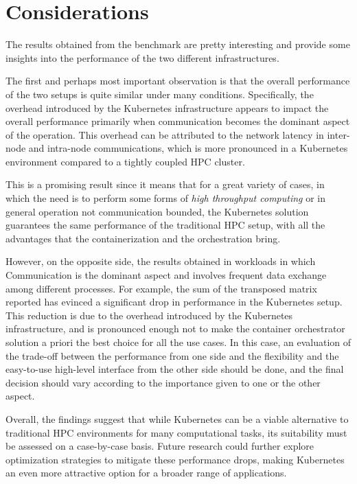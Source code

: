 \section{Considerations}

The results obtained from the benchmark are pretty interesting and provide some
insights into the performance of the two different infrastructures.

The first and perhaps most important observation is that the overall performance
of the two setups is quite similar under many conditions.
Specifically, the overhead introduced by the Kubernetes infrastructure appears
to impact the overall performance primarily when communication becomes the
dominant aspect of the operation. This overhead can be attributed to the network
latency in inter-node and intra-node communications, which is more pronounced in
a Kubernetes environment compared to a tightly coupled HPC cluster.

This is a promising result since it means that for a great variety of cases, in
which the need is to perform some forms of \textit{high throughput computing} or
in general operation not communication bounded, the Kubernetes solution
guarantees the same performance of the traditional HPC setup, with all the
advantages that the containerization and the orchestration bring.

However, on the opposite side, the results obtained in workloads in which
Communication is the dominant aspect and involves frequent data exchange among
different processes. For example, the sum of the transposed matrix reported has
evinced a significant drop in performance in the Kubernetes setup.
This reduction is due to the overhead introduced by the Kubernetes
infrastructure, and is pronounced enough not to make the container orchestrator
solution a priori the best choice for all the use cases.
In this case, an evaluation of the trade-off between the performance from one
side and the flexibility and the easy-to-use high-level interface from the other
side should be done, and the final decision should vary according to the
importance given to one or the other aspect.

Overall, the findings suggest that while Kubernetes can be a viable alternative
to traditional HPC environments for many computational tasks, its suitability
must be assessed on a case-by-case basis.
Future research could further explore optimization strategies to mitigate these
performance drops, making Kubernetes an even more attractive option for a
broader range of applications.
